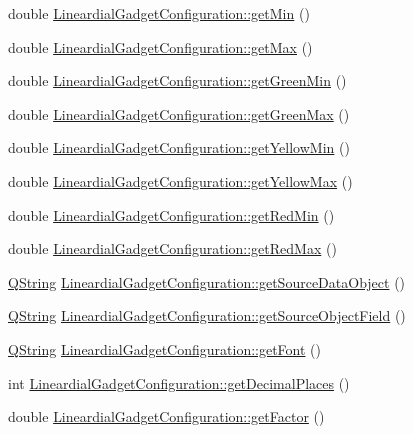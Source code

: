 \begin{DoxyCompactItemize}
\item 
double \hyperlink{group___linear_dial_plugin_ga43b18753744079052cb3b4e58a226eab}{\-Lineardial\-Gadget\-Configuration\-::get\-Min} ()
\item 
double \hyperlink{group___linear_dial_plugin_gae8b0681f133693a66256022babdca5cc}{\-Lineardial\-Gadget\-Configuration\-::get\-Max} ()
\item 
double \hyperlink{group___linear_dial_plugin_gaac4e3bef42979801094f4b3c47d83a07}{\-Lineardial\-Gadget\-Configuration\-::get\-Green\-Min} ()
\item 
double \hyperlink{group___linear_dial_plugin_gaf0f52dd07291d938390b228e8e0a90f2}{\-Lineardial\-Gadget\-Configuration\-::get\-Green\-Max} ()
\item 
double \hyperlink{group___linear_dial_plugin_gad39b6746e6b3b7c0e6d20794d2f494d9}{\-Lineardial\-Gadget\-Configuration\-::get\-Yellow\-Min} ()
\item 
double \hyperlink{group___linear_dial_plugin_ga2c58391f9aa712de50504d4437b54ded}{\-Lineardial\-Gadget\-Configuration\-::get\-Yellow\-Max} ()
\item 
double \hyperlink{group___linear_dial_plugin_ga2144cb1d1c1c13bd87529460a3ad88bc}{\-Lineardial\-Gadget\-Configuration\-::get\-Red\-Min} ()
\item 
double \hyperlink{group___linear_dial_plugin_ga022f5eeb2931bde01bb130ac6cb237b7}{\-Lineardial\-Gadget\-Configuration\-::get\-Red\-Max} ()
\item 
\hyperlink{group___u_a_v_objects_plugin_gab9d252f49c333c94a72f97ce3105a32d}{\-Q\-String} \hyperlink{group___linear_dial_plugin_ga6b635f5d74e7815014a597e5a38e5e80}{\-Lineardial\-Gadget\-Configuration\-::get\-Source\-Data\-Object} ()
\item 
\hyperlink{group___u_a_v_objects_plugin_gab9d252f49c333c94a72f97ce3105a32d}{\-Q\-String} \hyperlink{group___linear_dial_plugin_ga1de5843a26127b379137ee870ec74b89}{\-Lineardial\-Gadget\-Configuration\-::get\-Source\-Object\-Field} ()
\item 
\hyperlink{group___u_a_v_objects_plugin_gab9d252f49c333c94a72f97ce3105a32d}{\-Q\-String} \hyperlink{group___linear_dial_plugin_ga044d31fb1388d1f8b1b11f682c4e2aaa}{\-Lineardial\-Gadget\-Configuration\-::get\-Font} ()
\item 
int \hyperlink{group___linear_dial_plugin_gab0a4ac1f433766548d4f87e0d4c1c499}{\-Lineardial\-Gadget\-Configuration\-::get\-Decimal\-Places} ()
\item 
double \hyperlink{group___linear_dial_plugin_ga4bb648d826a5f7847ecdaa288a477b14}{\-Lineardial\-Gadget\-Configuration\-::get\-Factor} ()

\end{DoxyCompactItemize}
